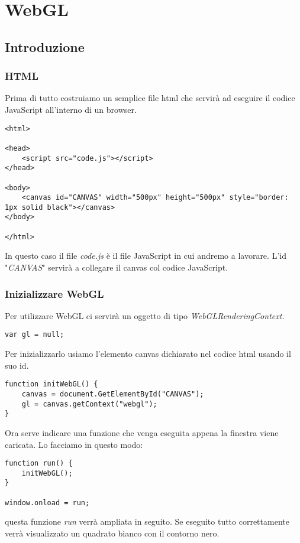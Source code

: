
\chapter{WebGL}
\section{Introduzione}
\subsection{HTML}
Prima di tutto costruiamo un semplice file html che servir\`a ad eseguire il codice JavaScript
all'interno di un browser.
\begin{lstlisting}[style=html]
<html>

<head>
	<script src="code.js"></script>
</head>

<body>
	<canvas id="CANVAS" width="500px" height="500px" style="border: 1px solid black"></canvas>
</body>

</html>
\end{lstlisting}
In questo caso il file \emph{code.js} \`e il file JavaScript in cui andremo a lavorare.
L'id "\emph{CANVAS}" servir\`a a collegare il canvas col codice JavaScript.

\subsection{Inizializzare WebGL}
Per utilizzare WebGL ci servir\`a un oggetto di tipo \emph{WebGLRenderingContext}.
\begin{lstlisting}[style=js]
var gl = null;
\end{lstlisting}
Per inizializzarlo usiamo l'elemento canvas dichiarato nel codice html usando il suo id.
\begin{lstlisting}[style=js, firstnumber=2]
function initWebGL() {
	canvas = document.GetElementById("CANVAS");
	gl = canvas.getContext("webgl");
}
\end{lstlisting}
Ora serve indicare una funzione che venga eseguita appena la finestra viene caricata. Lo
facciamo in questo modo:
\begin{lstlisting}[style=js, firstnumber=6]
function run() {
	initWebGL();
}

window.onload = run;
\end{lstlisting}
questa funzione \emph{run} verr\`a ampliata in seguito.
Se eseguito tutto correttamente verr\`a visualizzato un quadrato bianco con il contorno nero.

